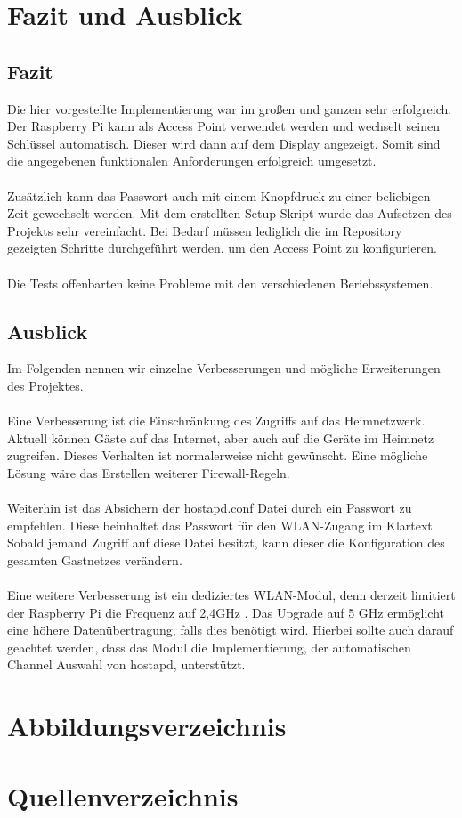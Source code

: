 \documentclass[a4paper,11pt,singlespacing]{article}
\begin{document}
    \section{Fazit und Ausblick}
	    \subsection{Fazit}
	    	Die hier vorgestellte Implementierung war im großen und ganzen sehr erfolgreich. Der Raspberry Pi kann als Access Point verwendet werden und wechselt seinen Schlüssel automatisch. Dieser wird dann auf dem Display angezeigt. Somit sind die angegebenen funktionalen Anforderungen erfolgreich umgesetzt. \\ \\ 
	    	Zusätzlich kann das Passwort auch mit einem Knopfdruck zu einer beliebigen Zeit gewechselt werden. Mit dem erstellten Setup Skript wurde das Aufsetzen des Projekts sehr vereinfacht. Bei Bedarf müssen lediglich die im Repository \cite{Quote_github_repo} gezeigten Schritte durchgeführt werden, um den Access Point zu konfigurieren. \\ \\
	    	Die Tests offenbarten keine Probleme mit den verschiedenen Beriebssystemen.\\
	    \subsection{Ausblick}
	    	Im Folgenden nennen wir einzelne Verbesserungen und mögliche Erweiterungen des Projektes. \\ \\
	    	Eine Verbesserung ist die Einschränkung des Zugriffs auf das Heimnetzwerk. Aktuell können Gäste auf das Internet, aber auch auf die Geräte im Heimnetz zugreifen. Dieses Verhalten ist normalerweise nicht gewünscht. Eine mögliche Lösung wäre das Erstellen weiterer Firewall-Regeln. \\ \\
	    	Weiterhin ist das Absichern der hostapd.conf Datei durch ein Passwort zu empfehlen. Diese beinhaltet das Passwort für den WLAN-Zugang im Klartext. Sobald jemand Zugriff auf diese Datei besitzt, kann dieser die Konfiguration des gesamten Gastnetzes verändern. \\ \\
	    	Eine weitere Verbesserung ist ein dediziertes WLAN-Modul, denn derzeit limitiert der Raspberry Pi die Frequenz auf 2,4GHz \cite{Quote_Raspberrypi3b}. Das Upgrade auf	 5 GHz ermöglicht eine höhere Datenübertragung, falls dies benötigt wird. Hierbei sollte auch darauf geachtet werden, dass das Modul die Implementierung, der automatischen Channel Auswahl von hostapd, unterstützt.
    
    
   	\pagebreak
   	\section{Abbildungsverzeichnis}
   	\listoffigures
   	\section{Quellenverzeichnis}
    
    
    	
\clearpage
\end{document}
